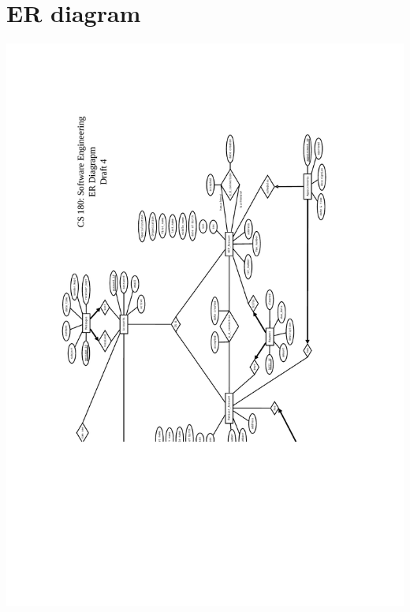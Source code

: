 \documentclass[12pt]{report}
\begin{document}
\chapter{ER diagram}
\includegraphics[scale=0.6]{cs180_ER_draft4.pdf}
\end{document}
